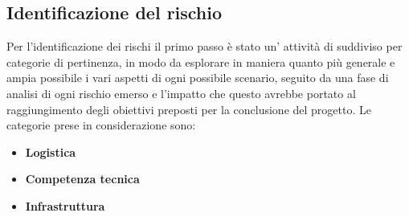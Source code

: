 \documentclass{scalatekids-article}
\begin{document}
\subsection{Identificazione del rischio}
Per l'identificazione dei rischi il primo passo è stato un' attività di
 suddiviso per categorie di pertinenza, in modo da esplorare
in maniera quanto più generale e ampia possibile i vari aspetti di ogni
possibile scenario, seguito da una fase di analisi di ogni rischio emerso e
l'impatto che questo avrebbe portato al raggiungimento degli obiettivi preposti
per la conclusione del progetto. Le categorie prese in considerazione sono:
\begin{itemize}
\item\textbf{Logistica}
\item\textbf{Competenza tecnica}
\item\textbf{Infrastruttura}
\end{itemize}
\end{document}
